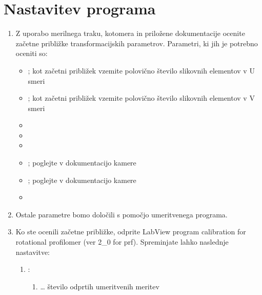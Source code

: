 \documentclass[letterpaper,10pt,english]{sphinxmanual}
\begin{document}
\section{Nastavitev programa}
\label{\detokenize{kalibracija:nastavitev-programa}}\begin{enumerate}
%
\item {} 
\sphinxAtStartPar
Z uporabo merilnega traku, kotomera in priložene dokumentacije ocenite začetne približke transformacijskih parametrov. Parametri, ki jih je potrebno oceniti so:
\begin{itemize}
\item {} 
\sphinxAtStartPar
{};    kot začetni približek vzemite polovično število slikovnih elementov v U smeri

\item {} 
\sphinxAtStartPar
{};    kot začetni približek vzemite polovično število slikovnih elementov v V smeri

\item {} 
\sphinxAtStartPar
{}

\item {} 
\sphinxAtStartPar
{}

\item {} 
\sphinxAtStartPar
{}

\item {} 
\sphinxAtStartPar
{}; poglejte v dokumentacijo kamere

\item {} 
\sphinxAtStartPar
{}; poglejte v dokumentacijo kamere

\item {} 
\sphinxAtStartPar
{}

\end{itemize}

\item {} 
\sphinxAtStartPar
Ostale parametre bomo določili s pomočjo umeritvenega programa.

\item {} 
\sphinxAtStartPar
Ko ste ocenili začetne približke, odprite LabView program calibration for rotational profilomer (ver 2\_0 for prf). Spreminjate lahko naslednje nastavitve:
\begin{enumerate}
%
\item {} 
\sphinxAtStartPar
{}:
\begin{enumerate}
%
\item {} 
\sphinxAtStartPar
{} … število odprtih umeritvenih meritev


\end{enumerate}
\end{enumerate}
\end{enumerate}
\end{document}
